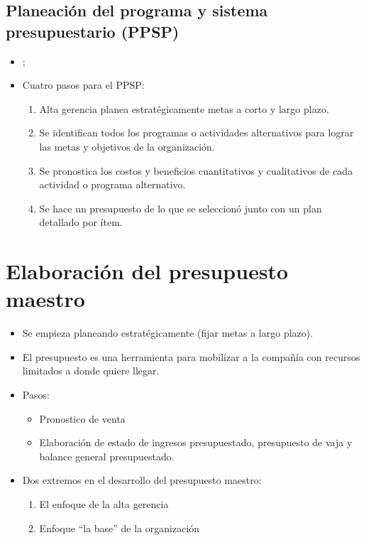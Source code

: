 \documentclass{article}
\begin{document}
\subsection{Planeación del programa y sistema presupuestario (PPSP)}
\begin{itemize}
    \item {}; 
    \item Cuatro pasos para el PPSP:
        \begin{enumerate}
            \item Alta gerencia planea estratégicamente metas a corto y largo plazo.
            \item Se identifican todos los programas o actividades alternativos para lograr las metas y objetivos de la organización.
            \item Se pronostica los costos y beneficios cuantitativos y cualitativos de cada actividad o programa alternativo.
            \item Se hace un presupuesto de lo que se seleccionó junto con un plan detallado por ítem.
        \end{enumerate}
\end{itemize}


\section{Elaboración del presupuesto maestro}
\begin{itemize}
    \item Se empieza planeando estratégicamente (fijar metas a largo plazo).
    \item El presupuesto es una herramienta para mobilizar a la compañía con recursos limitados a donde quiere llegar.
    \item Pasos:
        \begin{itemize}
            \item Pronostico de venta 
            \item Elaboración de estado de ingresos presupuestado, presupuesto de vaja y balance general presupuestado.  
        \end{itemize}
    
    \item Dos extremos en el desarrollo del presupuesto maestro:
        \begin{enumerate}
            \item El enfoque de la alta gerencia 
            \item Enfoque ``la base'' de la organización
        \end{enumerate}
\end{itemize}
\end{document}
